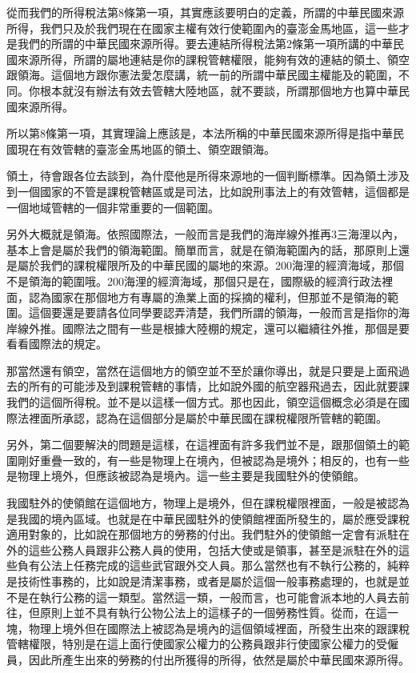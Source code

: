 \documentclass[oneside,sub3section]{ctexbook}
\begin{document}
從而我們的所得稅法第8條第一項，其實應該要明白的定義，所謂的中華民國來源所得，我們只及於我們現在在國家主權有效行使範圍內的臺澎金馬地區，這一些才是我們的所謂的中華民國來源所得。要去連結所得稅法第2條第一項所講的中華民國來源所得，所謂的屬地連結是你的課稅管轄權限，能夠有效的連結的領土、領空跟領海。這個地方跟你憲法愛怎麼講，統一前的所謂中華民國主權能及的範圍，不同。你根本就沒有辦法有效去管轄大陸地區，就不要談，所謂那個地方也算中華民國來源所得。

所以第8條第一項，其實理論上應該是，本法所稱的中華民國來源所得是指中華民國現在有效管轄的臺澎金馬地區的領土、領空跟領海。

領土，待會跟各位去談到，為什麼他是所得來源地的一個判斷標準。因為領土涉及到一個國家的不管是課稅管轄區或是司法，比如說刑事法上的有效管轄，這個都是一個地域管轄的一個非常重要的一個範圍。

另外大概就是領海。依照國際法，一般而言是我們的海岸線外推再3三海浬以內，基本上會是屬於我們的領海範圍。簡單而言，就是在領海範圍內的話，那原則上還是屬於我們的課稅權限所及的中華民國的屬地的來源。200海浬的經濟海域，那個不是領海的範圍哦。200海浬的經濟海域，那個只是在，國際級的經濟行政法裡面，認為國家在那個地方有專屬的漁業上面的採摘的權利，但那並不是領海的範圍。這個要還是要請各位同學要認弄清楚，我們所謂的領海，一般而言是指你的海岸線外推。國際法之間有一些是根據大陸棚的規定，還可以繼續往外推，那個是要看看國際法的規定。

那當然還有領空，當然在這個地方的領空並不至於讓你導出，就是只要是上面飛過去的所有的可能涉及到課稅管轄的事情，比如說外國的航空器飛過去，因此就要課我們的這個所得稅。並不是以這樣一個方式。那也因此，領空這個概念必須是在國際法裡面所承認，認為在這個部分是屬於中華民國在課稅權限所管轄的範圍。

另外，第二個要解決的問題是這樣，在這裡面有許多我們並不是，跟那個領土的範圍剛好重疊一致的，有一些是物理上在境內，但被認為是境外；相反的，也有一些是物理上境外，但應該被認為是境內。這一些主要是我國駐外的使領館。

我國駐外的使領館在這個地方，物理上是境外，但在課稅權限裡面，一般是被認為是我國的境內區域。也就是在中華民國駐外的使領館裡面所發生的，屬於應受課稅適用對象的，比如說在那個地方的勞務的付出。我們駐外的使領館一定會有派駐在外的這些公務人員跟非公務人員的使用，包括大使或是領事，甚至是派駐在外的這些負有公法上任務完成的這些武官跟外交人員。那么當然也有不執行公務的，純粹是技術性事務的，比如說是清潔事務，或者是屬於這個一般事務處理的，也就是並不是在執行公務的這一類型。當然這一類，一般而言，也可能會派本地的人員去前往，但原則上並不具有執行公物公法上的這樣子的一個勞務性質。從而，在這一塊，物理上境外但在國際法上被認為是境內的這個領域裡面，所發生出來的跟課稅管轄權限，特別是在這上面行使國家公權力的公務員跟非行使國家公權力的受僱員，因此所產生出來的勞務的付出所獲得的所得，依然是屬於中華民國來源所得。
\end{document}
